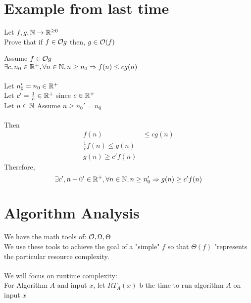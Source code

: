 \documentclass[12pt, letterpaper, twoside]{article}
\begin{document}
\section{Example from last time}
Let $f, g, \mathbb N \to \mathbb R^{\ge 0}$\\
Prove that if $f \in \mathcal O{g}$ then, $g \in \mathcal O(f)$\\

\begin{aproof}
    Assume $f \in \mathcal O{g}$\\
    $\exists c, n_0 \in \mathbb R^+, \forall n \in \mathbb N, n \ge n_0 \mathrel{\Rightarrow} f(n) \le cg(n)$\\
    \\ 
    Let $n_0' = n_0 \in \mathbb R^+$\\
    Let $c' = \frac{1}{c} \in \mathbb R^+$ since $c \in \mathbb R^+$\\
    Let $n \in \mathbb N$ Assume $n \ge n_0' = n_0$\\ 
    \\
    Then
    \begin{align*}
        f(n) &\le cg(n)\\
        \frac{1}{c}f(n) \le g(n)\\
        g(n) \ge c'f(n)
    \end{align*}
    Therefore,
    $$
    \exists c', n+0' \in \mathbb R^+, \forall n \in \mathbb N, n \ge n_0' \mathrel{\Rightarrow} g(n) \ge c'f(n)
    $$
\end{aproof}

\section{Algorithm Analysis}

    We have the math tools of: $\mathcal O, \Omega, \Theta$\\
    We use these tools to achieve the goal of a "simple" $f$ so that $\Theta(f)$ "represents the particular resource complexity.
\\
\\
    We will focus on runtime complexity:\\
    For Algorithm $A$ and input $x$, let $RT_A(x)$ b the time to run algorithm $A$ on input $x$\\
\end{document}
